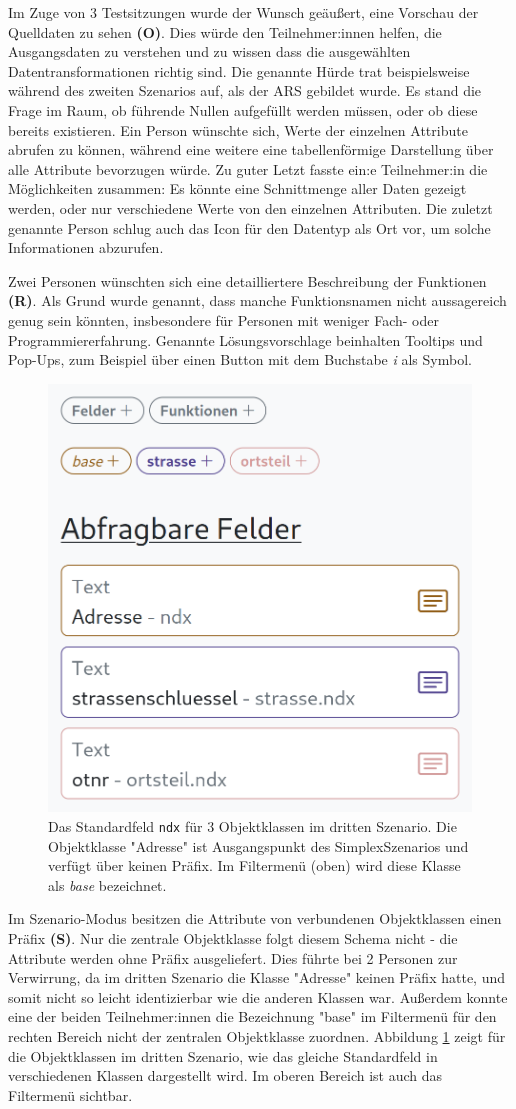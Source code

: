 Im Zuge von 3 Testsitzungen wurde der Wunsch geäußert, eine Vorschau der Quelldaten zu sehen \textbf{(O)}. Dies würde den Teilnehmer:innen helfen, die Ausgangsdaten zu verstehen und zu wissen dass die ausgewählten Datentransformationen richtig sind. Die genannte Hürde trat beispielsweise während des zweiten Szenarios auf, als der \ac{ARS} gebildet wurde. Es stand die Frage im Raum, ob führende Nullen aufgefüllt werden müssen, oder ob diese bereits existieren. Ein Person wünschte sich, Werte der einzelnen Attribute abrufen zu können, während eine weitere eine tabellenförmige Darstellung über alle Attribute bevorzugen würde. Zu guter Letzt fasste ein:e Teilnehmer:in die Möglichkeiten zusammen: Es könnte eine Schnittmenge aller Daten gezeigt werden, oder nur verschiedene Werte von den einzelnen Attributen. Die zuletzt genannte Person schlug auch das Icon für den Datentyp als Ort vor, um solche Informationen abzurufen.

Zwei Personen wünschten sich eine detailliertere Beschreibung der Funktionen \textbf{(R)}. Als Grund wurde genannt, dass manche Funktionsnamen nicht aussagereich genug sein könnten, insbesondere für Personen mit weniger Fach- oder Programmiererfahrung. Genannte Lösungsvorschlage beinhalten Tooltips und Pop-Ups, zum Beispiel über einen Button mit dem Buchstabe \textit{i} als Symbol.

\begin{figure}[!ht]
  \centering
  \includegraphics[width=.5\textwidth]{assets/scenario-prefixes.png}
  \caption{Das Standardfeld \texttt{ndx} für 3 Objektklassen im dritten Szenario. Die Objektklasse "Adresse" ist Ausgangspunkt des SimplexSzenarios und verfügt über keinen Präfix. Im Filtermenü (oben) wird diese Klasse als \textit{base} bezeichnet.}
  \label{fig:scenario-prefixes}
\end{figure}
Im Szenario-Modus besitzen die Attribute von verbundenen Objektklassen einen Präfix \textbf{(S)}. Nur die zentrale Objektklasse folgt diesem Schema nicht - die Attribute werden ohne Präfix ausgeliefert. Dies führte bei 2 Personen zur Verwirrung, da im dritten Szenario die Klasse "Adresse" keinen Präfix hatte, und somit nicht so leicht identizierbar wie die anderen Klassen war. Außerdem konnte eine der beiden Teilnehmer:innen die Bezeichnung "base" im Filtermenü für den rechten Bereich nicht der zentralen Objektklasse zuordnen. Abbildung \ref{fig:scenario-prefixes} zeigt für die Objektklassen im dritten Szenario, wie das gleiche Standardfeld in verschiedenen Klassen dargestellt wird. Im oberen Bereich ist auch das Filtermenü sichtbar.


